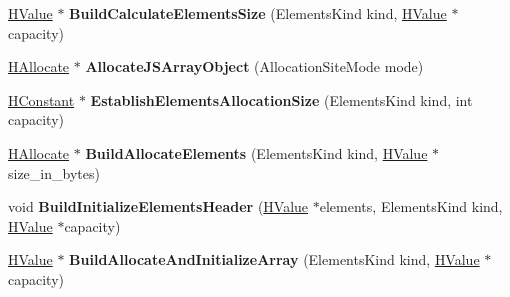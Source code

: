 \begin{DoxyCompactItemize}
\item 
\hyperlink{classv8_1_1internal_1_1_h_value}{H\+Value} $\ast$ {\bfseries Build\+Calculate\+Elements\+Size} (Elements\+Kind kind, \hyperlink{classv8_1_1internal_1_1_h_value}{H\+Value} $\ast$capacity)\hypertarget{classv8_1_1internal_1_1_h_graph_builder_a993d18a4444924ee5dcee91fedfab723}{}\label{classv8_1_1internal_1_1_h_graph_builder_a993d18a4444924ee5dcee91fedfab723}

\item 
\hyperlink{classv8_1_1internal_1_1_h_allocate}{H\+Allocate} $\ast$ {\bfseries Allocate\+J\+S\+Array\+Object} (Allocation\+Site\+Mode mode)\hypertarget{classv8_1_1internal_1_1_h_graph_builder_ab78c23015a1be8b65ed8e9ad8f370cac}{}\label{classv8_1_1internal_1_1_h_graph_builder_ab78c23015a1be8b65ed8e9ad8f370cac}

\item 
\hyperlink{classv8_1_1internal_1_1_h_constant}{H\+Constant} $\ast$ {\bfseries Establish\+Elements\+Allocation\+Size} (Elements\+Kind kind, int capacity)\hypertarget{classv8_1_1internal_1_1_h_graph_builder_a5c1d8c722b0a399dbd0514dbabeb3c8a}{}\label{classv8_1_1internal_1_1_h_graph_builder_a5c1d8c722b0a399dbd0514dbabeb3c8a}

\item 
\hyperlink{classv8_1_1internal_1_1_h_allocate}{H\+Allocate} $\ast$ {\bfseries Build\+Allocate\+Elements} (Elements\+Kind kind, \hyperlink{classv8_1_1internal_1_1_h_value}{H\+Value} $\ast$size\+\_\+in\+\_\+bytes)\hypertarget{classv8_1_1internal_1_1_h_graph_builder_a0aae5017ce562a06089659a4e6e60965}{}\label{classv8_1_1internal_1_1_h_graph_builder_a0aae5017ce562a06089659a4e6e60965}

\item 
void {\bfseries Build\+Initialize\+Elements\+Header} (\hyperlink{classv8_1_1internal_1_1_h_value}{H\+Value} $\ast$elements, Elements\+Kind kind, \hyperlink{classv8_1_1internal_1_1_h_value}{H\+Value} $\ast$capacity)\hypertarget{classv8_1_1internal_1_1_h_graph_builder_af62597c303c06ccfccfd7dbbae0a7af1}{}\label{classv8_1_1internal_1_1_h_graph_builder_af62597c303c06ccfccfd7dbbae0a7af1}

\item 
\hyperlink{classv8_1_1internal_1_1_h_value}{H\+Value} $\ast$ {\bfseries Build\+Allocate\+And\+Initialize\+Array} (Elements\+Kind kind, \hyperlink{classv8_1_1internal_1_1_h_value}{H\+Value} $\ast$capacity)\hypertarget{classv8_1_1internal_1_1_h_graph_builder_a3639614cdef68fb7fce8bcc919bc3524}{}\label{classv8_1_1internal_1_1_h_graph_builder_a3639614cdef68fb7fce8bcc919bc3524}


\end{DoxyCompactItemize}
